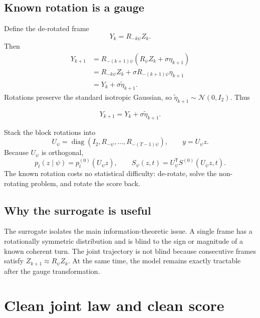 \documentclass[11pt,a4paper]{article}
\newcommand{\N}{\mathcal{N}}
\newcommand{\diag}{\operatorname{diag}}
\begin{document}
\subsection{Known rotation is a gauge}

Define the de-rotated frame
\begin{equation}
 Y_k=R_{-k\psi}Z_k.
 \label{eq:derotation}
\end{equation}
Then
\begin{align}
 Y_{k+1}
 &=R_{-(k+1)\psi}(R_\psi Z_k+\sigma\eta_{k+1})\\
 &=R_{-k\psi}Z_k+\sigma R_{-(k+1)\psi}\eta_{k+1}\\
 &=Y_k+\sigma\widetilde\eta_{k+1}.
\end{align}
Rotations preserve the standard isotropic Gaussian, so $\widetilde\eta_{k+1}\sim\N(0,I_2)$. Thus
\begin{keyresult}
\begin{equation}
 \boxed{Y_{k+1}=Y_k+\sigma\widetilde\eta_{k+1}.}
 \label{eq:gauged-rw}
\end{equation}
\end{keyresult}

Stack the block rotations into
\[
 U_\psi=\diag(I_2,R_{-\psi},\ldots,R_{-(T-1)\psi}),
 \qquad y=U_\psi z.
\]
Because $U_\psi$ is orthogonal,
\begin{equation}
 p_t(z\mid\psi)=p_t^{(0)}(U_\psi z),
 \qquad
 S_\psi(z,t)=U_\psi^\mathsf{T}S^{(0)}(U_\psi z,t).
 \label{eq:gauge-score}
\end{equation}
The known rotation costs no statistical difficulty: de-rotate, solve the non-rotating problem, and rotate the score back.

\subsection{Why the surrogate is useful}

The surrogate isolates the main information-theoretic issue. A single frame has a rotationally symmetric distribution and is blind to the sign or magnitude of a known coherent turn. The joint trajectory is not blind because consecutive frames satisfy $Z_{k+1}\approx R_\psi Z_k$. At the same time, the model remains exactly tractable after the gauge transformation.

\section{Clean joint law and clean score}
\end{document}
